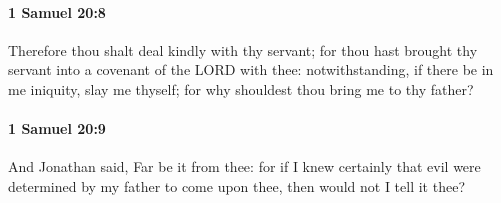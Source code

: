 		\paragraph{1 Samuel 20:8} %
			\label{1SAMUEL-20-8}

			Therefore thou shalt deal kindly with thy servant; for thou hast brought thy servant into a covenant of the LORD with thee: notwithstanding, if there be in me iniquity, slay me thyself; for why shouldest thou bring me to thy father?


		\paragraph{1 Samuel 20:9} %
			\label{1SAMUEL-20-9}

			And Jonathan said, Far be it from thee: for if I knew certainly that evil were determined by my father to come upon thee, then would not I tell it thee?

